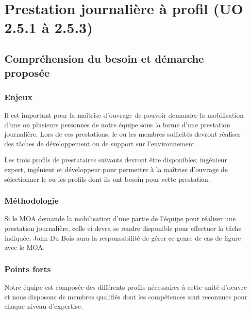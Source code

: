 	\section{Prestation journalière à profil (UO 2.5.1 à 2.5.3)}
		\subsection{Compréhension du besoin et démarche proposée}
		\subsubsection{Enjeux}		
		Il est important pour la maîtrise d’ouvrage de pouvoir demander la mobilisation d’une ou plusieurs personnes de notre équipe sous la forme d’une prestation journalière. Lors de ces prestations, le ou les membres sollicités devront réaliser des tâches de développement ou de support sur l’environnement \correlyce{}.
		
		Les trois profils de prestataires suivants devront être disponibles; ingénieur expert, ingénieur et développeur pour permettre à la maîtrise d’ouvrage de sélectionner le ou les profils dont ils ont besoin pour cette prestation. 
		
		\subsubsection{Méthodologie}	
		Si le MOA demande la mobilisation d’une partie de l’équipe pour réaliser une prestation journalière, celle ci devra se rendre disponible pour effectuer la tâche indiquée. John Du Bois aura la responsabilité de gérer ce genre de cas de figure avec le MOA.
		
		\subsubsection{Points forts}
		Notre équipe est composée des différents profils nécessaires à cette unité d’oeuvre et nous disposons de membres qualifiés dont les compétences sont reconnues pour chaque niveau d’expertise.
		
